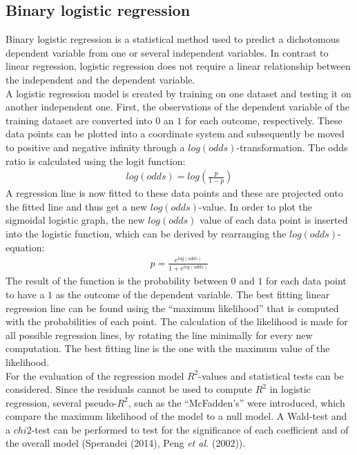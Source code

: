 \documentclass[
  parskip,
  oneside]{scrreprt}
\begin{document}
\hypertarget{binary-logistic-regression}{%
\subsection{Binary logistic
regression}\label{binary-logistic-regression}}

Binary logistic regression is a statistical method used to predict a
dichotomous dependent variable from one or several independent
variables. In contrast to linear regression, logistic regression does
not require a linear relationship between the independent and the
dependent variable.\\
A logistic regression model is created by training on one dataset and
testing it on another independent one. First, the observations of the
dependent variable of the training dataset are converted into \(0\) an
\(1\) for each outcome, respectively. These data points can be plotted
into a coordinate system and subsequently be moved to positive and
negative infinity through a \(log(odds)\)-transformation. The odds ratio
is calculated using the logit function: \begin{gather*}
log(odds)=log(\frac{p}{1-p})
\end{gather*} A regression line is now fitted to these data points and
these are projected onto the fitted line and thus get a new
\(log(odds)\)-value. In order to plot the sigmoidal logistic graph, the
new \(log(odds)\) value of each data point is inserted into the logistic
function, which can be derived by rearranging the
\(log(odds)\)-equation: \begin{gather*}
p=\frac{e^{log(odds)}}{1+e^{log(odds)}}
\end{gather*} The result of the function is the probability between
\(0\) and \(1\) for each data point to have a \(1\) as the outcome of
the dependent variable. The best fitting linear regression line can be
found using the ``maximum likelihood'' that is computed with the
probabilities of each point. The calculation of the likelihood is made
for all possible regression lines, by rotating the line minimally for
every new computation. The best fitting line is the one with the maximum
value of the likelihood.\\
For the evaluation of the regression model \(R^2\)-values and
statistical tests can be considered. Since the residuals cannot be used
to compute \(R^2\) in logistic regression, several pseudo-\(R^2\), such
as the ``McFadden's'' were introduced, which compare the maximum
likelihood of the model to a null model. A Wald-test and a \(chi2\)-test
can be performed to test for the significance of each coefficient and of
the overall model (Sperandei (2014), Peng \emph{et al.} (2002)).
\end{document}
